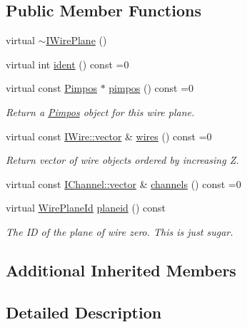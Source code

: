 \subsection*{Public Member Functions}
\begin{DoxyCompactItemize}
\item 
virtual \hyperlink{class_wire_cell_1_1_i_wire_plane_af8ab9502915f7fa2e1296915617b7ea6}{$\sim$\+I\+Wire\+Plane} ()
\item 
virtual int \hyperlink{class_wire_cell_1_1_i_wire_plane_af6ee6155a91ec58ba2abbec9bab63a39}{ident} () const =0
\item 
virtual const \hyperlink{class_wire_cell_1_1_pimpos}{Pimpos} $\ast$ \hyperlink{class_wire_cell_1_1_i_wire_plane_a906ad17d425080349082a719b4362a36}{pimpos} () const =0
\begin{DoxyCompactList}\small\item\em Return a \hyperlink{class_wire_cell_1_1_pimpos}{Pimpos} object for this wire plane. \end{DoxyCompactList}\item 
virtual const \hyperlink{class_wire_cell_1_1_i_data_ae1a9f863380499bb43f39fabb6276660}{I\+Wire\+::vector} \& \hyperlink{class_wire_cell_1_1_i_wire_plane_ad5f6668d7faefcd895daf602dc60be1a}{wires} () const =0
\begin{DoxyCompactList}\small\item\em Return vector of wire objects ordered by increasing Z. \end{DoxyCompactList}\item 
virtual const \hyperlink{class_wire_cell_1_1_i_data_ae1a9f863380499bb43f39fabb6276660}{I\+Channel\+::vector} \& \hyperlink{class_wire_cell_1_1_i_wire_plane_ad8bbb5fc7d09e19ea546262b8162a3c0}{channels} () const =0
\item 
virtual \hyperlink{class_wire_cell_1_1_wire_plane_id}{Wire\+Plane\+Id} \hyperlink{class_wire_cell_1_1_i_wire_plane_af43d2d7b981ab0eb4c5a4cc458f7bb1e}{planeid} () const
\begin{DoxyCompactList}\small\item\em The ID of the plane of wire zero. This is just sugar. \end{DoxyCompactList}\end{DoxyCompactItemize}
\subsection*{Additional Inherited Members}


\subsection{Detailed Description}


